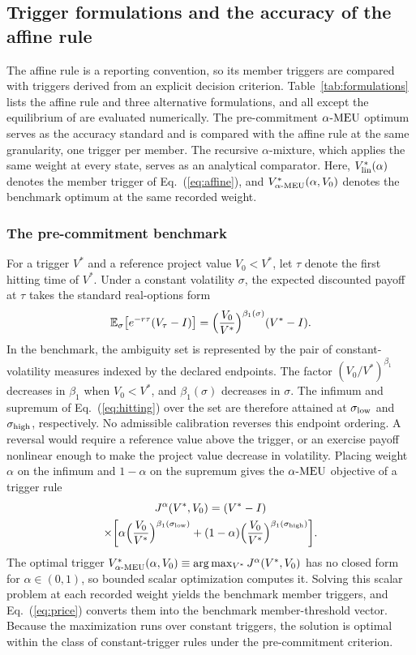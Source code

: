 \subsection{Trigger formulations and the accuracy of the affine rule}

The affine rule is a reporting convention, so its member triggers are compared with triggers derived from an explicit decision criterion. Table~\ref{tab:formulations} lists the affine rule and three alternative formulations, and all except the equilibrium of \citet{HuangYu2021} are evaluated numerically. The pre-commitment $\alpha\text{-MEU}$ optimum serves as the accuracy standard and is compared with the affine rule at the same granularity, one trigger per member. The recursive $\alpha$-mixture, which applies the same weight at every state, serves as an analytical comparator. Here, $V^{*}_{\mathrm{lin}}(\alpha)$ denotes the member trigger of Eq.~(\ref{eq:affine}), and $V^{*}_{\alpha\text{-MEU}}(\alpha,V_0)$ denotes the benchmark optimum at the same recorded weight.

\subsubsection{The pre-commitment benchmark}

For a trigger $V^{*}$ and a reference project value $V_0<V^{*}$, let $\tau$ denote the first hitting time of $V^{*}$. Under a constant volatility $\sigma$, the expected discounted payoff at $\tau$ takes the standard real-options form
\begin{equation}
\mathbb{E}_{\sigma}\bigl[e^{-r\tau}(V_{\tau}-I)\bigr]=\Bigl(\frac{V_0}{V^{*}}\Bigr)^{\beta_1(\sigma)}(V^{*}-I).
\label{eq:hitting}
\end{equation}
In the benchmark, the ambiguity set is represented by the pair of constant-volatility measures indexed by the declared endpoints. The factor $(V_0/V^{*})^{\beta_1}$ decreases in $\beta_1$ when $V_0<V^{*}$, and $\beta_1(\sigma)$ decreases in $\sigma$. The infimum and supremum of Eq.~(\ref{eq:hitting}) over the set are therefore attained at $\sigma_{\mathrm{low}}$ and $\sigma_{\mathrm{high}}$, respectively. No admissible calibration reverses this endpoint ordering. A reversal would require a reference value above the trigger, or an exercise payoff nonlinear enough to make the project value decrease in volatility. Placing weight $\alpha$ on the infimum and $1-\alpha$ on the supremum gives the $\alpha\text{-MEU}$ objective of a trigger rule
\begin{multline}
J^{\alpha}(V^{*},V_0)=(V^{*}-I)\\
\times\biggl[\alpha\Bigl(\frac{V_0}{V^{*}}\Bigr)^{\beta_1(\sigma_{\mathrm{low}})}+(1-\alpha)\Bigl(\frac{V_0}{V^{*}}\Bigr)^{\beta_1(\sigma_{\mathrm{high}})}\biggr].
\label{eq:Jalpha}
\end{multline}
The optimal trigger $V^{*}_{\alpha\text{-MEU}}(\alpha,V_0)\equiv\arg\max_{V^{*}}J^{\alpha}(V^{*},V_0)$ has no closed form for $\alpha\in(0,1)$, so bounded scalar optimization computes it. Solving this scalar problem at each recorded weight yields the benchmark member triggers, and Eq.~(\ref{eq:price}) converts them into the benchmark member-threshold vector. Because the maximization runs over constant triggers, the solution is optimal within the class of constant-trigger rules under the pre-commitment criterion.

